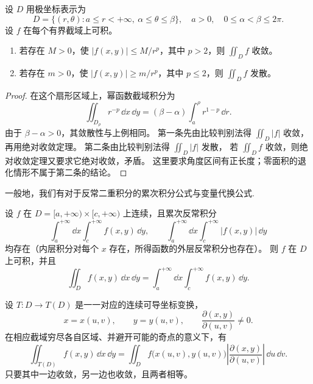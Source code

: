 \begin{corollary}
设 $D$ 用极坐标表示为
\[
D=\{(r,\theta):a\le r<+\infty,\ \alpha\le\theta\le\beta\},
\quad a>0,\quad 0\le\alpha<\beta\le2\pi.
\]
设 $f$ 在每个有界截域上可积。
\begin{enumerate}
\item 若存在 $M>0$，使 $|f(x,y)|\le M/r^p$，其中 $p>2$，则 $\displaystyle\iint_Df$ 收敛。
\item 若存在 $m>0$，使 $|f(x,y)|\ge m/r^p$，其中 $p\le2$，则 $\displaystyle\iint_Df$ 发散。
\end{enumerate}
\end{corollary}
\begin{proof}
在这个扇形区域上，幂函数截域积分为
\[
\displaystyle\iint_{D_\rho}r^{-p}\,\dd x\,\dd y
=(\beta-\alpha)\int_a^\rho r^{1-p}\,\dd r.
\]
由于 $\beta-\alpha>0$，其敛散性与上例相同。
第一条先由比较判别法得 $\displaystyle\iint_D|f|$ 收敛，再用绝对收敛定理。
第二条由比较判别法得 $\displaystyle\iint_D|f|$ 发散，
若 $\displaystyle\iint_Df$ 收敛，则绝对收敛定理又要求它绝对收敛，矛盾。
这里要求角度区间有正长度；零面积的退化情形不属于第二条的结论。
\end{proof}
一般地，我们有对于反常二重积分的累次积分公式与变量代换公式.
\begin{theorem}[化为累次反常积分]\label{p2-improper-iterated}
设 $f$ 在 $D=[a,+\infty)\times[c,+\infty)$ 上连续，且累次反常积分
\[
\int_a^{+\infty}\dd x\int_c^{+\infty}f(x,y)\,\dd y,
\qquad
\int_a^{+\infty}\dd x\int_c^{+\infty}|f(x,y)|\,\dd y
\]
均存在（内层积分对每个 $x$ 存在，所得函数的外层反常积分也存在）。
则 $f$ 在 $D$ 上可积，并且
\[
\displaystyle\iint_Df(x,y)\,\dd x\,\dd y
=\int_a^{+\infty}\dd x\int_c^{+\infty}f(x,y)\,\dd y.
\]
\end{theorem}


\begin{theorem}[反常二重积分的变量代换]
设 $T:D\to T(D)$ 是一一对应的连续可导坐标变换，
\[
x=x(u,v),\qquad y=y(u,v),\qquad
\frac{\partial(x,y)}{\partial(u,v)}\ne0.
\]
在相应截域穷尽各自区域、并避开可能的奇点的意义下，有
\[
\displaystyle\iint_{T(D)}f(x,y)\,\dd x\,\dd y
=\displaystyle\iint_Df\bigl(x(u,v),y(u,v)\bigr)
\left|\frac{\partial(x,y)}{\partial(u,v)}\right|\,\dd u\,\dd v.
\]
只要其中一边收敛，另一边也收敛，且两者相等。
\end{theorem}

